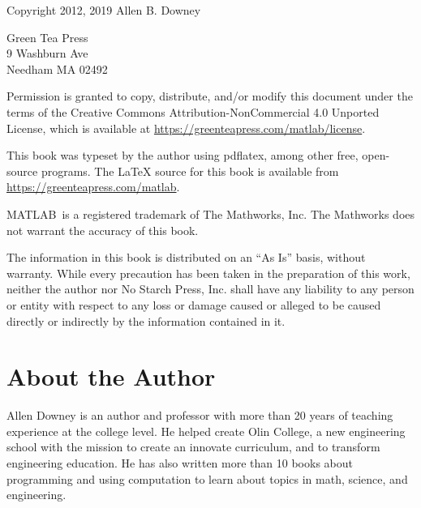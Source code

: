 
\maketitle

\vspace{2in}

\begin{center}
 {\Large \thetitle}

\vspace{0.25in}

Copyright 2012, 2019 Allen B. Downey
\end{center}

\vspace{0.25in}

\begin{flushleft}
Green Tea Press       \\
9 Washburn Ave \\
Needham MA 02492
\end{flushleft}

Permission is granted to copy, distribute, and/or modify this document under the terms of the Creative Commons Attribution-NonCommercial 4.0 Unported License, which is available at \url{https://greenteapress.com/matlab/license}.

This book was typeset by the author using pdflatex, among other free, open-source programs.
 The LaTeX source for this book is available from \url{https://greenteapress.com/matlab}.

MATLAB\myreg\ is a registered trademark of The Mathworks, Inc.  The Mathworks does not warrant the accuracy  of this book.

The information in this book is distributed on an ``As Is'' basis,
without warranty. While every precaution has been taken in the
preparation of this work, neither the author nor No Starch Press, Inc.
shall have any liability to any person or entity with respect to any
loss or damage caused or alleged to be caused directly or indirectly
by the information contained in it.



\thispagestyle{empty}

\null\vskip1.175in

\section*{About the Author}
Allen Downey is an author and professor with more than 20 years of teaching experience at the college level. He helped create Olin College, a new engineering school with the mission to create an innovate curriculum, and to transform engineering education. He has also written more than 10 books about programming and using computation to learn about topics in math, science, and engineering.
